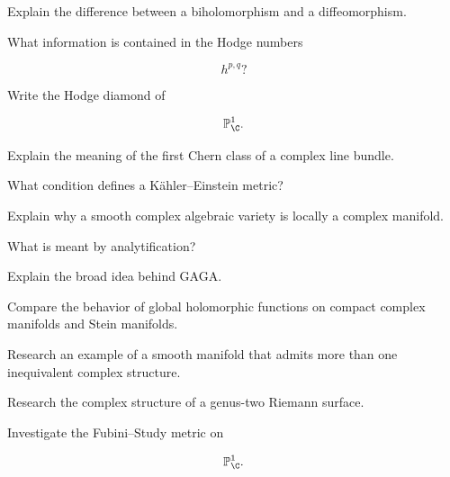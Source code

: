 \begin{exercise}[3]
Explain the difference between a biholomorphism and a diffeomorphism.
\end{exercise}

\begin{exercise}[3]
What information is contained in the Hodge numbers

\[
h^{p,q}?
\]
\end{exercise}

\begin{exercise}[3]
Write the Hodge diamond of

\[
\mathbb{P}^1_{\C}.
\]
\end{exercise}

\begin{exercise}[3]
Explain the meaning of the first Chern class of a complex line bundle.
\end{exercise}

\begin{exercise}[3]
What condition defines a K\"ahler--Einstein metric?
\end{exercise}

\begin{exercise}[3]
Explain why a smooth complex algebraic variety is locally a complex
manifold.
\end{exercise}

\begin{exercise}[3]
What is meant by analytification?
\end{exercise}

\begin{exercise}[3]
Explain the broad idea behind GAGA.
\end{exercise}

\begin{exercise}[3]
Compare the behavior of global holomorphic functions on compact complex
manifolds and Stein manifolds.
\end{exercise}

\begin{exercise}[4]
Research an example of a smooth manifold that admits more than one
inequivalent complex structure.
\end{exercise}

\begin{exercise}[4]
Research the complex structure of a genus-two Riemann surface.
\end{exercise}

\begin{exercise}[4]
Investigate the Fubini--Study metric on

\[
\mathbb{P}^1_{\C}.
\]
\end{exercise}

